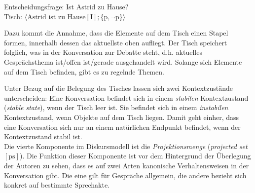 \begin{exe}
	\ex\label{230} 
			Entscheidungsfrage: Ist Astrid zu Hause?\\
			Tisch: $\langle \textrm{Astrid ist zu Hause} [\textrm{I}];\lbrace \textrm{p},\neg \textrm{p}\rbrace\rangle$
\end{exe}
Dazu kommt die Annahme, dass die Elemente auf dem Tisch einen Stapel formen, innerhalb dessen das aktuellste  oben aufliegt. Der Tisch speichert folglich, was in der Konversation zur Debatte steht, d.h. aktuelles Gesprächsthema ist/offen ist/gerade ausgehandelt wird. Solange sich Elemente auf dem Tisch befinden, gibt es zu regelnde Themen.

Unter Bezug auf die Belegung des Tisches lassen sich zwei Kontextzustände unterscheiden: Eine Konversation befindet sich in einem \textit{stabilen} Kontextzustand  (\textit{stable state}), wenn der Tisch leer ist. Sie befindet sich in einem \textit{instabilen} Kontextzustand,  wenn Objekte auf dem Tisch liegen. Damit geht einher, dass eine Konversation sich nur an einem natürlichen Endpunkt befindet, wenn der Kontextzustand stabil ist.\\

\noindent
Die vierte Komponente im Diskursmodell ist die \textit{Projektionsmenge} (\textit{projected set} $[\textrm{ps}]$). Die Funktion dieser Komponente ist vor dem Hintergrund der Überlegung der Autoren zu sehen, dass es auf zwei Arten kanonische Verhaltensweisen in der Konversation gibt. Die eine gilt für Gespräche allgemein, die andere bezieht sich konkret auf bestimmte Sprechakte. 

